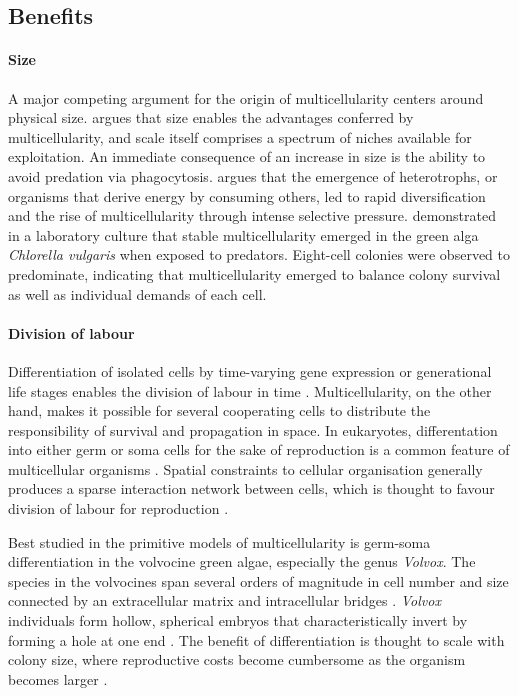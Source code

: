 \subsection{Benefits} \label{subsec:benefits}
\paragraph*{Size}
A major competing argument for the origin of multicellularity centers around physical size. 
\citet{bonner1998} argues that size enables the advantages conferred by multicellularity, and scale itself comprises a spectrum of niches available for exploitation.
An immediate consequence of an increase in size is the ability to avoid predation via phagocytosis.
\citet{stanley1973} argues that the emergence of heterotrophs, or organisms that derive energy by consuming others, led to rapid diversification and the rise of multicellularity through intense selective pressure. 
\citet{boraas1998} demonstrated in a laboratory culture that stable multicellularity emerged in the green alga \textit{Chlorella vulgaris} when exposed to predators.
Eight-cell colonies were observed to predominate, indicating that multicellularity emerged to balance colony survival as well as individual demands of each cell.

\paragraph*{Division of labour} Differentiation of isolated cells by time-varying gene expression or generational life stages enables the division of labour in time \citep{grosberg2007,brunet2017}.
Multicellularity, on the other hand, makes it possible for several cooperating cells to distribute the responsibility of survival and propagation in space.
In eukaryotes, differentation into either germ or soma cells for the sake of reproduction is a common feature of multicellular organisms \citep{cheng2020}. 
Spatial constraints to cellular organisation generally produces a sparse interaction network between cells, which is thought to favour division of labour for reproduction \citep{yanni2020}.

Best studied in the primitive models of multicellularity is germ-soma differentiation in the volvocine green algae, especially the genus \textit{Volvox}.
The species in the volvocines span several orders of magnitude in cell number and size connected by an extracellular matrix and intracellular bridges \citep{larson1992,kirk2005}.
\textit{Volvox} individuals form hollow, spherical embryos that characteristically invert by forming a hole at one end \citep{viamontes1977,kirk2001}.
The benefit of differentiation is thought to scale with colony size, where reproductive costs become cumbersome as the organism becomes larger \citep{solari2006a,solari2013}.

